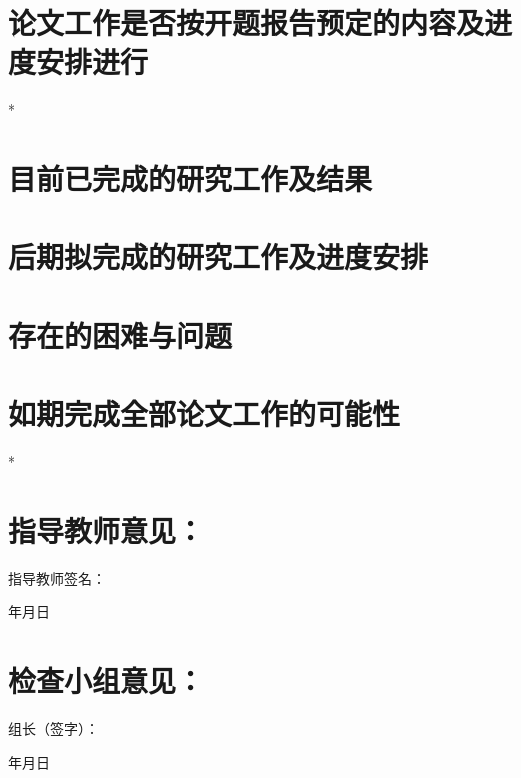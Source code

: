 \section{论文工作是否按开题报告预定的内容及进度安排进行}*

\lipsum[1]

\section{目前已完成的研究工作及结果}

\lipsum[2-3]

\section{后期拟完成的研究工作及进度安排}

\lipsum[2-3]

\section{存在的困难与问题}

\lipsum[2-3]

\section{如期完成全部论文工作的可能性}*

\lipsum[2-3]

\section*{指导教师意见：}

\lipsum[2-3]

\vspace{24bp}
\hfill 指导教师签名：\hspace{8\ccwd}

\vspace{24bp}
\hfill 年\hspace{2\ccwd}月\hspace{2\ccwd}日

\section*{检查小组意见：}

\lipsum[2-3]

\vspace{24bp}
\hfill 组长（签字）：\hspace{8\ccwd}

\vspace{24bp}
\hfill 年\hspace{2\ccwd}月\hspace{2\ccwd}日
